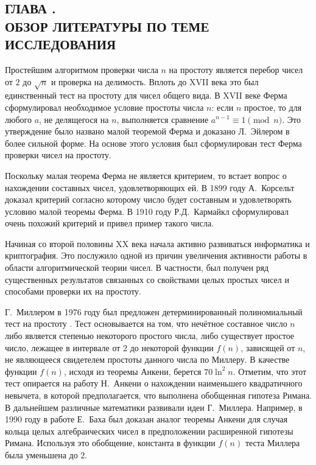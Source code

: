 \documentclass[_00_dissertation.tex]{subfiles}
\begin{document}
\onlyinsubfile{
    \renewcommand{\contentsname}{ОГЛАВЛЕНИЕ}
    \setcounter{tocdepth}{3}
    \tableofcontents
}

\begin{center}
    \chapter*{ГЛАВА .\\ ОБЗОР ЛИТЕРАТУРЫ ПО ТЕМЕ ИССЛЕДОВАНИЯ}\label{chapter:Literature_review}
\end{center}


Простейшим алгоритмом проверки числа $n$ на простоту является перебор чисел от $2$ до $\sqrt{n}$ и проверка на делимость.
Вплоть до XVII века это был единственный тест на простоту для чисел общего вида.
В XVII веке Ферма сформулировал необходимое условие простоты числа $n$: если $n$ простое, то для любого $a$, не делящегося на $n$, выполняется сравнение $a^{n-1} \equiv 1{\pmod{n}}$.
Это утверждение было названо малой теоремой Ферма и доказано Л.~Эйлером в более сильной форме.
На основе этого условия был сформулирован тест Ферма проверки чисел на простоту.

Поскольку малая теорема Ферма не является критерием, то встает вопрос о нахождении составных чисел, удовлетворяющих ей.
В 1899 году А.~Корсельт доказал критерий согласно которому число будет составным и удовлетворять условию малой теоремы Ферма.
В 1910 году Р.Д.~Кармайкл сформулировал очень похожий критерий и привел пример такого числа.

Начиная со второй половины XX века начала активно развиваться информатика и криптография.
Это послужило одной из причин увеличения активности работы в области алгоритмической теории чисел.
В частности, был получен ряд существенных результатов связанных со свойствами целых простых чисел и способами проверки их на простоту.

Г.~Миллером в 1976 году был предложен детерминированный полиномиальный тест на простоту \cite{source:Miller}.
Тест основывается на том, что нечётное составное число $n$ либо является степенью некоторого простого числа, либо существует простое число, лежащее в интервале от $2$ до некоторой функции $f(n)$, зависящей от $n$, не являющееся свидетелем простоты данного числа по Миллеру.
В качестве функции $f(n)$, исходя из теоремы Анкени, берется $70 \ln^2 n$.
Отметим, что этот тест опирается на работу Н.~Анкени о нахождении наименьшего квадратичного невычета, в которой предполагается, что выполнена обобщенная гипотеза Римана.
В дальнейшем различные математики развивали идеи Г.~Миллера.
Например, в 1990 году в работе Е.~Баха \cite{source:Bach} был доказан аналог теоремы Анкени для случая кольца целых алгебраических чисел в предположении расширенной гипотезы Римана.
Используя это обобщение, константа в функции $f(n)$ теста Миллера была уменьшена до $2$.
\end{document}
